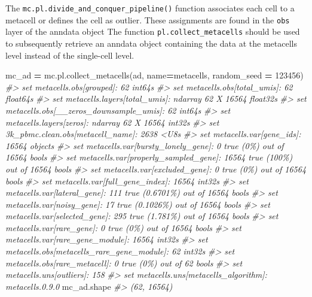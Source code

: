 \documentclass[
]{book}
\newenvironment{Shaded}{\begin{snugshade}}{\end{snugshade}}
\newcommand{\CommentTok}[1]{\textcolor[rgb]{0.56,0.35,0.01}{\textit{#1}}}
\newcommand{\DecValTok}[1]{\textcolor[rgb]{0.00,0.00,0.81}{#1}}
\newcommand{\NormalTok}[1]{#1}
\newcommand{\OperatorTok}[1]{\textcolor[rgb]{0.81,0.36,0.00}{\textbf{#1}}}
\newcommand{\StringTok}[1]{\textcolor[rgb]{0.31,0.60,0.02}{#1}}
\begin{document}
The \texttt{mc.pl.divide\_and\_conquer\_pipeline()} function associates each cell to a metacell or defines the cell as outlier. These assignments are found in the \texttt{obs} layer of the anndata object
The function \texttt{pl.collect\_metacells} should be used to subsequently retrieve an anndata object containing the data at the metacells level instead of the single-cell level.

\begin{Shaded}
\begin{Highlighting}[]

\NormalTok{mc\_ad }\OperatorTok{=}\NormalTok{ mc.pl.collect\_metacells(ad, name}\OperatorTok{=}\StringTok{\textquotesingle{}metacells\textquotesingle{}}\NormalTok{, random\_seed }\OperatorTok{=} \DecValTok{123456}\NormalTok{)}
\CommentTok{\#\textgreater{} set metacells.obs[grouped]: 62 int64s}
\CommentTok{\#\textgreater{} set metacells.obs[total\_umis]: 62 float64s}
\CommentTok{\#\textgreater{} set metacells.layers[total\_umis]: ndarray 62 X 16564 float32s}
\CommentTok{\#\textgreater{} set metacells.obs[\_\_zeros\_downsample\_umis]: 62 int64s}
\CommentTok{\#\textgreater{} set metacells.layers[zeros]: ndarray 62 X 16564 int32s}
\CommentTok{\#\textgreater{} set 3k\_pbmc.clean.obs[metacell\_name]: 2638 \textless{}U8s}
\CommentTok{\#\textgreater{} set metacells.var[gene\_ids]: 16564 objects}
\CommentTok{\#\textgreater{} set metacells.var[bursty\_lonely\_gene]: 0 true (0\%) out of 16564 bools}
\CommentTok{\#\textgreater{} set metacells.var[properly\_sampled\_gene]: 16564 true (100\%) out of 16564 bools}
\CommentTok{\#\textgreater{} set metacells.var[excluded\_gene]: 0 true (0\%) out of 16564 bools}
\CommentTok{\#\textgreater{} set metacells.var[full\_gene\_index]: 16564 int32s}
\CommentTok{\#\textgreater{} set metacells.var[lateral\_gene]: 111 true (0.6701\%) out of 16564 bools}
\CommentTok{\#\textgreater{} set metacells.var[noisy\_gene]: 17 true (0.1026\%) out of 16564 bools}
\CommentTok{\#\textgreater{} set metacells.var[selected\_gene]: 295 true (1.781\%) out of 16564 bools}
\CommentTok{\#\textgreater{} set metacells.var[rare\_gene]: 0 true (0\%) out of 16564 bools}
\CommentTok{\#\textgreater{} set metacells.var[rare\_gene\_module]: 16564 int32s}
\CommentTok{\#\textgreater{} set metacells.obs[metacells\_rare\_gene\_module]: 62 int32s}
\CommentTok{\#\textgreater{} set metacells.obs[rare\_metacell]: 0 true (0\%) out of 62 bools}
\CommentTok{\#\textgreater{} set metacells.uns[outliers]: 158}
\CommentTok{\#\textgreater{} set metacells.uns[metacells\_algorithm]: metacells.0.9.0}
\NormalTok{mc\_ad.shape}
\CommentTok{\#\textgreater{} (62, 16564)}
\end{Highlighting}
\end{Shaded}
\end{document}
